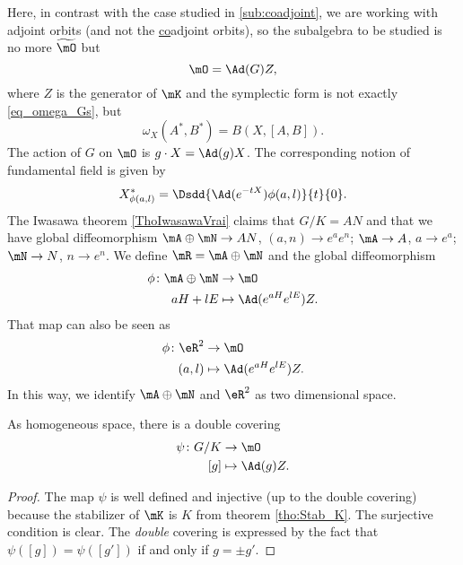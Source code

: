 Here, in contrast with the case studied in \ref{sub:coadjoint}, we are working with adjoint orbits (and not the \underline{co}adjoint orbits), so the subalgebra to be studied is no more $\widetilde{\mO}$ but
\[
    \mO=\Ad(G)Z,
\]
where $Z$ is the generator of $\mK$ and the symplectic form is not exactly \eqref{eq_omega_Gs}, but
\begin{equation}\label{eq:omega_G}
  \omega_X(A^*,B^*)=B(X,[A,B]).
\end{equation}
The action of $G$ on $\mO$ is $g\cdot X=\Ad(g)X$. The corresponding notion of fundamental field is given by
\[
   X^*_{\phi(a,l)}=\Dsdd{ \Ad(e^{-tX})\phi(a,l) }{t}{0}.
\]
The Iwasawa theorem \ref{ThoIwasawaVrai} claims that $G/K=AN$ and that we have global diffeomorphism $\mA\oplus\mN\to AN$, $(a,n)\to e^ae^n$; $\mA\to A$, $a\to e^a$; $\mN\to N$, $n\to e^n$. We define $\mR=\mA\oplus\mN$ and the global diffeomorphism 
\begin{equation}	\label{EqDefphiaHlEZ}
\begin{aligned}
 \phi\colon \mA\oplus\mN&\to \mO \\ 
 aH+lE&\mapsto \Ad( e^{aH} e^{lE})Z.
\end{aligned}
\end{equation}
 That map can also be seen as 
\begin{equation}
\begin{aligned}
 \phi\colon\eR^2&\to \mO \\ 
(a,l)&\mapsto\Ad(e^{aH}e^{lE})Z.
\end{aligned}
\end{equation}
 In this way, we identify $\mA\oplus\mN$ and $\eR^2$ as two dimensional space.
\begin{proposition}
As homogeneous space, there is a double covering
\begin{equation}
\begin{aligned}
 \psi\colon G/K&\to \mO \\ 
[g]&\mapsto \Ad(g)Z. 
\end{aligned}
\end{equation}

\end{proposition}
\begin{proof}
The map $\psi$ is well defined and injective (up to the double covering) because the stabilizer of $\mK$ is $K$ from theorem \ref{tho:Stab_K}. The surjective condition is clear. The \emph{double} covering is expressed by the fact that $\psi([g])=\psi([g'])$ if and only if $g=\pm g'$.
\end{proof}

